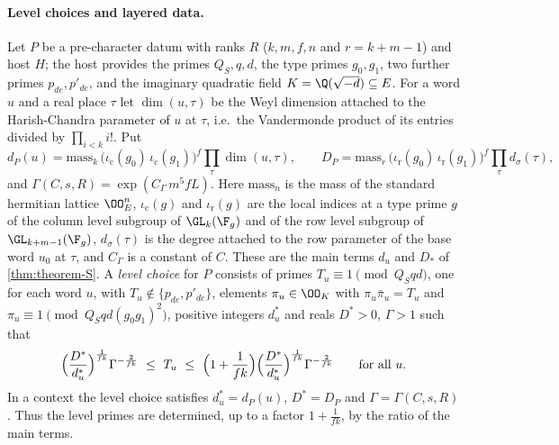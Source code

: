 \paragraph{Level choices and layered data.}
Let $P$ be a pre-character datum with ranks $R$ ($k,m,f,n$ and $r=k+m-1$) and host $H$; the host provides the primes
$Q_S,q,d$, the type primes $g_0,g_1$, two further primes $p_{de},p'_{de}$, and the imaginary quadratic field
$K=\Q(\sqrt{-d})\subseteq E$. For a word $u$ and a real place $\tau$ let $\dim(u,\tau)$ be the Weyl dimension attached to
the Harish-Chandra parameter of $u$ at $\tau$, i.e.\ the Vandermonde product of its entries divided by $\prod_{i<k}i!$.
Put
\begin{equation}\label{pf:stageU:eq:dD}
d_P(u)=\mathrm{mass}_k\,\bigl(\iota_{\mathrm{c}}(g_0)\,\iota_{\mathrm{c}}(g_1)\bigr)^{f}\prod_{\tau}\dim(u,\tau),\qquad
D_P=\mathrm{mass}_r\,\bigl(\iota_{\mathrm{r}}(g_0)\,\iota_{\mathrm{r}}(g_1)\bigr)^{f}\prod_\tau d_\sigma(\tau),
\end{equation}
and $\Gamma(C,s,R)=\exp(C_\Gamma\,m^5fL)$. Here $\mathrm{mass}_n$ is the mass of the standard hermitian lattice $\OO_E^n$,
$\iota_{\mathrm{c}}(g)$ and $\iota_{\mathrm{r}}(g)$ are the local indices at a type prime $g$ of the column level subgroup of
$\GL_k(\F_g)$ and of the row level subgroup of $\GL_{k+m-1}(\F_g)$, $d_\sigma(\tau)$ is the degree attached to the row
parameter of the base word $u_0$ at $\tau$, and $C_\Gamma$ is a constant of $C$. These are the main terms $d_u$ and $D_*$
of \cref{thm:theorem-S}. A \emph{level choice} for $P$ consists of primes $T_u\equiv1\pmod{Q_Sqd}$, one for each word
$u$, with $T_u\notin\{p_{de},p'_{de}\}$, elements $\pi_u\in\OO_K$ with $\pi_u\bar\pi_u=T_u$ and
$\pi_u\equiv1\pmod{Q_Sqd(g_0g_1)^2}$, positive integers $d^*_u$ and reals $D^*>0$, $\Gamma>1$ such that
\begin{equation}\label{pf:stageU:eq:Twin}
\Bigl(\frac{D^*}{d^*_u}\Bigr)^{\frac1{fk}}\Gamma^{-\frac2{fk}}\ \le\ T_u\ \le\
\Bigl(1+\frac1{fk}\Bigr)\Bigl(\frac{D^*}{d^*_u}\Bigr)^{\frac1{fk}}\Gamma^{-\frac2{fk}}\qquad\text{for all }u.
\end{equation}
In a context the level choice satisfies $d^*_u=d_P(u)$, $D^*=D_P$ and $\Gamma=\Gamma(C,s,R)$. Thus the level primes are
determined, up to a factor $1+\frac1{fk}$, by the ratio of the main terms.


